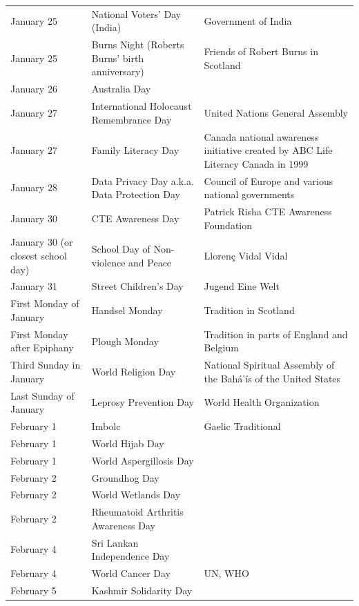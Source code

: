 \documentclass[
  openany]{book}
\begin{document}
\begin{longtable}[t]{>{\raggedright\arraybackslash}p{8em}>{\raggedright\arraybackslash}p{18em}>{\raggedright\arraybackslash}p{10em}}
January 25 & National Voters' Day (India) & Government of India\\
\addlinespace
\rowcolor{gray!6}  January 25 & Burns Night (Roberts Burns' birth anniversary) & Friends of Robert Burns in Scotland\\
January 26 & Australia Day & \\
\rowcolor{gray!6}  January 27 & International Holocaust Remembrance Day & United Nations General Assembly\\
January 27 & Family Literacy Day & Canada national awareness initiative created by ABC Life Literacy Canada in 1999\\
\rowcolor{gray!6}  January 28 & Data Privacy Day a.k.a. Data Protection Day & Council of Europe and various national governments\\
\addlinespace
January 30 & CTE Awareness Day & Patrick Risha CTE Awareness Foundation\\
\rowcolor{gray!6}  January 30 (or closest school day) & School Day of Non-violence and Peace & Llorenç Vidal Vidal\\
January 31 & Street Children's Day & Jugend Eine Welt\\
\rowcolor{gray!6}  First Monday of January & Handsel Monday & Tradition in Scotland\\
First Monday after Epiphany & Plough Monday & Tradition in parts of England and Belgium\\
\addlinespace
\rowcolor{gray!6}  Third Sunday in January & World Religion Day & National Spiritual Assembly of the Bahá'ís of the United States\\
Last Sunday of January & Leprosy Prevention Day & World Health Organization\\
\rowcolor{gray!6}  February 1 & Imbolc & Gaelic Traditional\\
February 1 & World Hijab Day & \\
\rowcolor{gray!6}  February 1 & World Aspergillosis Day & \\
\addlinespace
February 2 & Groundhog Day & \\
\rowcolor{gray!6}  February 2 & World Wetlands Day & \\
February 2 & Rheumatoid Arthritis Awareness Day & \\
\rowcolor{gray!6}  February 4 & Sri Lankan Independence Day & \\
February 4 & World Cancer Day & UN, WHO\\
\addlinespace
\rowcolor{gray!6}  February 5 & Kashmir Solidarity Day & \\

\end{longtable}
\end{document}
